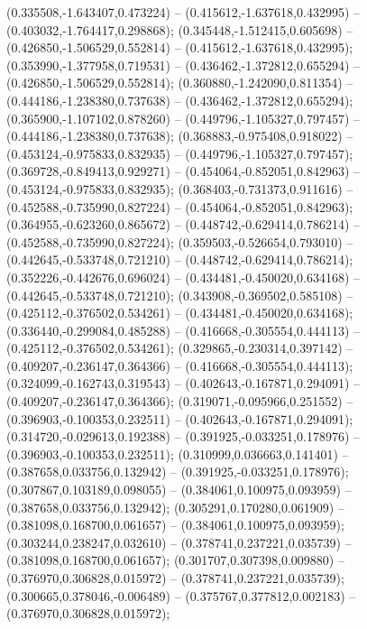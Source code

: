  (0.335508,-1.643407,0.473224) -- (0.415612,-1.637618,0.432995) -- (0.403032,-1.764417,0.298868);
 (0.345448,-1.512415,0.605698) -- (0.426850,-1.506529,0.552814) -- (0.415612,-1.637618,0.432995);
 (0.353990,-1.377958,0.719531) -- (0.436462,-1.372812,0.655294) -- (0.426850,-1.506529,0.552814);
 (0.360880,-1.242090,0.811354) -- (0.444186,-1.238380,0.737638) -- (0.436462,-1.372812,0.655294);
 (0.365900,-1.107102,0.878260) -- (0.449796,-1.105327,0.797457) -- (0.444186,-1.238380,0.737638);
 (0.368883,-0.975408,0.918022) -- (0.453124,-0.975833,0.832935) -- (0.449796,-1.105327,0.797457);
 (0.369728,-0.849413,0.929271) -- (0.454064,-0.852051,0.842963) -- (0.453124,-0.975833,0.832935);
 (0.368403,-0.731373,0.911616) -- (0.452588,-0.735990,0.827224) -- (0.454064,-0.852051,0.842963);
 (0.364955,-0.623260,0.865672) -- (0.448742,-0.629414,0.786214) -- (0.452588,-0.735990,0.827224);
 (0.359503,-0.526654,0.793010) -- (0.442645,-0.533748,0.721210) -- (0.448742,-0.629414,0.786214);
 (0.352226,-0.442676,0.696024) -- (0.434481,-0.450020,0.634168) -- (0.442645,-0.533748,0.721210);
 (0.343908,-0.369502,0.585108) -- (0.425112,-0.376502,0.534261) -- (0.434481,-0.450020,0.634168);
 (0.336440,-0.299084,0.485288) -- (0.416668,-0.305554,0.444113) -- (0.425112,-0.376502,0.534261);
 (0.329865,-0.230314,0.397142) -- (0.409207,-0.236147,0.364366) -- (0.416668,-0.305554,0.444113);
 (0.324099,-0.162743,0.319543) -- (0.402643,-0.167871,0.294091) -- (0.409207,-0.236147,0.364366);
 (0.319071,-0.095966,0.251552) -- (0.396903,-0.100353,0.232511) -- (0.402643,-0.167871,0.294091);
 (0.314720,-0.029613,0.192388) -- (0.391925,-0.033251,0.178976) -- (0.396903,-0.100353,0.232511);
 (0.310999,0.036663,0.141401) -- (0.387658,0.033756,0.132942) -- (0.391925,-0.033251,0.178976);
 (0.307867,0.103189,0.098055) -- (0.384061,0.100975,0.093959) -- (0.387658,0.033756,0.132942);
 (0.305291,0.170280,0.061909) -- (0.381098,0.168700,0.061657) -- (0.384061,0.100975,0.093959);
 (0.303244,0.238247,0.032610) -- (0.378741,0.237221,0.035739) -- (0.381098,0.168700,0.061657);
 (0.301707,0.307398,0.009880) -- (0.376970,0.306828,0.015972) -- (0.378741,0.237221,0.035739);
 (0.300665,0.378046,-0.006489) -- (0.375767,0.377812,0.002183) -- (0.376970,0.306828,0.015972);
